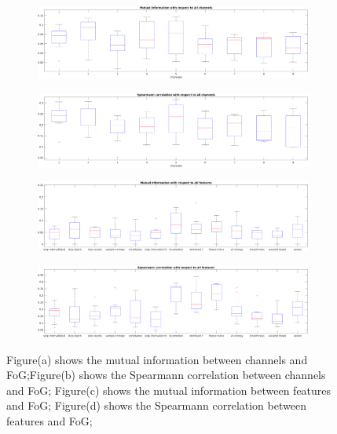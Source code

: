 \documentclass[article]{article}
\begin{document}
    
   	\begin{figure}
    	
    	\begin{subfigure}[b]{0.47\textwidth}
    		\centering
    		\includegraphics[width=\textwidth]{MutualA}
    		\caption{}
    		\label{fig:y equals x}
    	\end{subfigure}
		\hfill
    	\begin{subfigure}[b]{0.47\textwidth}
		\centering
		\includegraphics[width=\textwidth]{spearmannA}
		\caption{}
		\label{fig:y equals x}
		\end{subfigure}
	
		\begin{subfigure}[b]{0.47\textwidth}
			\centering
			\includegraphics[width=\textwidth]{MutualF}
			\caption{}
			\label{fig:y equals x}
		\end{subfigure}
		\hfill
		\begin{subfigure}[b]{0.47\textwidth}
			\centering
			\includegraphics[width=\textwidth]{spearmannF}
			\caption{}
			\label{fig:y equals x}
		\end{subfigure}
    
    	\caption{Figure(a) shows the mutual information between channels and FoG;Figure(b) shows the Spearmann correlation between channels and FoG;
    	Figure(c) shows the mutual information between features and FoG;
		Figure(d) shows the Spearmann correlation between features and FoG;}
    	\label{fs}
    \end{figure}
    
\end{document}
